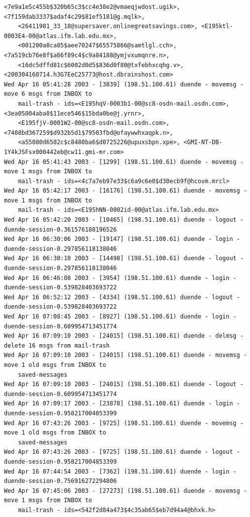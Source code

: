 \begin{lstlisting}[style=terminal]
    <7e9a1e5c455b$320b65c3$cc4e38e2@vmaeqjwdost.ugik>, <7f159dab3337$adaf4c29$81ef5181@g.mqlk>, 
    <26411981_33_18@supersaver.onlinegreatsavings.com>, <E195ktl-0003E4-00@atlas.ifm.lab.edu.mx>, 
    <001200a8ca85$aee70247$65575866@samtlgl.cch>, <7a519cb76e8f$a66f89c4$c9a84188@ymjvxumqnre.n>, 
    <16dc5dffd81c$6002d0d5$836d0f80@txfebhxcqhg.v>, <200304160714.h3G7EeC25773@host.dbrainshost.com>
Wed Apr 16 05:41:28 2003 - [3839] (198.51.100.61) duende - movemsg - move 6 msgs from INBOX to 
    mail-trash - ids=<E195hqV-0003b1-00@sc8-osdn-mail.osdn.com>, <3ea05004aba8$11ece546$15bda0be@j.yrnr>, 
    <E195fjV-0001W2-00@sc8-osdn-mail.osdn.com>, <7408bd367259$d932b5d1$79503fbd@ofaywwhxaqpk.n>, 
    <a55080d6582c$c8480ba6$d0725226@upuxsbpn.xpe>, <GMI-NT-DB-1Y4kJSFsx000442eb@cw11.gmi-mr.com>
Wed Apr 16 05:41:43 2003 - [1299] (198.51.100.61) duende - movemsg - move 1 msgs from INBOX to 
    mail-trash - ids=<4c7a7eb97e33$c6a9c6e0$d30ecb9f@hcovm.mrcl>
Wed Apr 16 05:42:17 2003 - [16176] (198.51.100.61) duende - movemsg - move 1 msgs from INBOX to 
    mail-trash - ids=<E195hNN-0002id-00@atlas.ifm.lab.edu.mx>
Wed Apr 16 05:42:20 2003 - [10465] (198.51.100.61) duende - logout - duende-session-0.361576188196526
Wed Apr 16 06:30:06 2003 - [19147] (198.51.100.61) duende - login - duende-session-0.297856118138046
Wed Apr 16 06:30:10 2003 - [14498] (198.51.100.61) duende - logout - duende-session-0.297856118138046
Wed Apr 16 06:46:08 2003 - [3954] (198.51.100.61) duende - login - duende-session-0.539828403693722
Wed Apr 16 06:52:12 2003 - [4334] (198.51.100.61) duende - logout - duende-session-0.539828403693722
Wed Apr 16 07:08:45 2003 - [8927] (198.51.100.61) duende - login - duende-session-0.609954713451774
Wed Apr 16 07:09:10 2003 - [24015] (198.51.100.61) duende - delmsg - delete 16 msgs from mail-trash
Wed Apr 16 07:09:10 2003 - [24015] (198.51.100.61) duende - movemsg - move 1 old msgs from INBOX to 
    saved-messages
Wed Apr 16 07:09:10 2003 - [24015] (198.51.100.61) duende - logout - duende-session-0.609954713451774
Wed Apr 16 07:09:17 2003 - [23878] (198.51.100.61) duende - login - duende-session-0.958217004853399
Wed Apr 16 07:43:26 2003 - [9725] (198.51.100.61) duende - movemsg - move 1 old msgs from INBOX to 
    saved-messages
Wed Apr 16 07:43:26 2003 - [9725] (198.51.100.61) duende - logout - duende-session-0.958217004853399
Wed Apr 16 07:44:54 2003 - [7362] (198.51.100.61) duende - login - duende-session-0.756916272294806
Wed Apr 16 07:45:06 2003 - [27273] (198.51.100.61) duende - movemsg - move 1 msgs from INBOX to 
    mail-trash - ids=<542f2d84a473$4c35ab65$eb7d94a4@bhxk.h>

\end{lstlisting}
